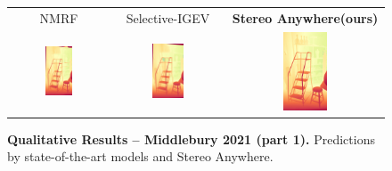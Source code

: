 \documentclass[10pt,twocolumn,letterpaper]{article}
\newcommand{\method}[0]{Stereo Anywhere\xspace}
\begin{document}
\begin{figure}[h]
\begin{tabular}{ccc}
        \small NMRF \cite{guan2024neural} &
        \small Selective-IGEV \cite{wang2024selective} &
        \textbf{\method (ours)} \\
        \includegraphics[width=0.3\textwidth]{imgs/midd21/stereo/NMRF/10.jpg} &
        \includegraphics[width=0.3\textwidth]{imgs/midd21/stereo/Selective/10.jpg} &
        \includegraphics[width=0.3\textwidth]{imgs/midd21/stereo/Ours/10.jpg} \\
    \end{tabular}\vspace{-0.3cm}
    \caption{\textbf{Qualitative Results -- Middlebury 2021 (part 1).} Predictions by state-of-the-art models and \method.}
    \label{fig:qual_midd21_1}\vspace{-0.3cm}
\end{figure}
\end{document}
